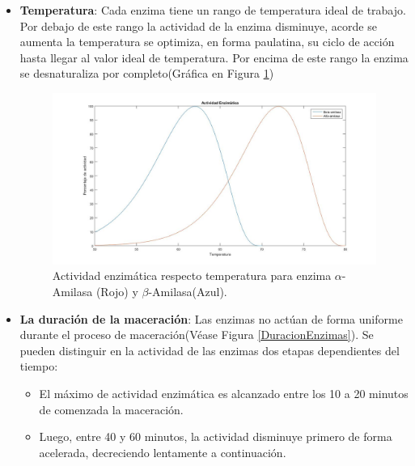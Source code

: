                 \begin{itemize}
                
                    \item {\textbf{Temperatura}:} Cada enzima tiene un rango de temperatura ideal de trabajo. Por debajo de este rango la actividad de la enzima disminuye, acorde se aumenta la temperatura se optimiza, en forma paulatina, su ciclo de acción hasta llegar al valor ideal de temperatura. Por encima de este rango la enzima se desnaturaliza por completo(Gráfica en Figura \ref{TemperaturaEnzimas})
                    
                    \begin{figure} [h]		                                                                \centerline{\includegraphics[scale=0.3]{temperatura_amilasas.jpg}}
		                \caption{Actividad enzimática respecto temperatura para enzima $\alpha$-Amilasa (Rojo) y $\beta$-Amilasa(Azul).}
	                    \label{TemperaturaEnzimas}
    	           \end{figure}
    	           
    	            \item {\textbf{La duración de la maceración}:} Las enzimas no actúan de forma uniforme durante el proceso de maceración(Véase Figura \ref{DuracionEnzimas}). Se pueden distinguir en la actividad de las enzimas dos etapas dependientes del tiempo:
    	            
    	                \begin{itemize}
    	                    \item El máximo de actividad enzimática es alcanzado entre los 10 a 20 minutos de comenzada la maceración.
    	                    
    	                    \item Luego, entre 40 y 60 minutos, la actividad disminuye primero de forma acelerada, decreciendo lentamente a continuación.
    	               

\end{itemize}
\end{itemize}
